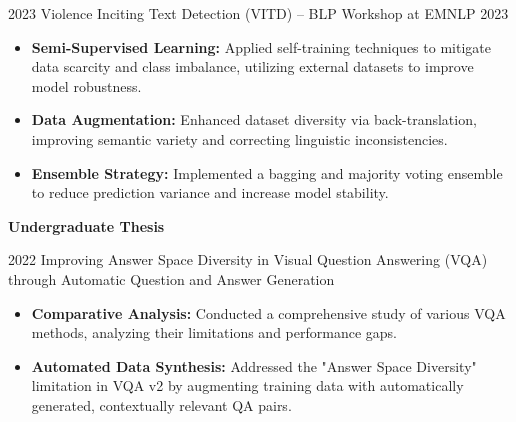 \begin{researches}
    \research
        {2023}   {Violence Inciting Text Detection (VITD) – BLP Workshop at EMNLP 2023}
        {} {
          \begin{itemize}
            \item \textbf{Semi-Supervised Learning:} Applied self-training techniques to mitigate data scarcity and class imbalance, utilizing external datasets to improve model robustness.
            \item \textbf{Data Augmentation:} Enhanced dataset diversity via back-translation, improving semantic variety and correcting linguistic inconsistencies.
            \item \textbf{Ensemble Strategy:} Implemented a bagging and majority voting ensemble to reduce prediction variance and increase model stability.
          \end{itemize}
        } {}
\end{researches}

\vspace{-2em}
\hspace{.5em}
{\normalsize \textbf{Undergraduate Thesis}}
\vspace{-1em}

\begin{researches}
    \research
        {2022}   {Improving Answer Space Diversity in Visual Question Answering (VQA) through Automatic Question and Answer Generation}
        {} {
          \begin{itemize}
            \item \textbf{Comparative Analysis:} Conducted a comprehensive study of various VQA methods, analyzing their limitations and performance gaps.
            \item \textbf{Automated Data Synthesis:} Addressed the "Answer Space Diversity" limitation in VQA v2 by augmenting training data with automatically generated, contextually relevant QA pairs.
          \end{itemize}
        } {}
\end{researches}

\vspace{-1.5em}